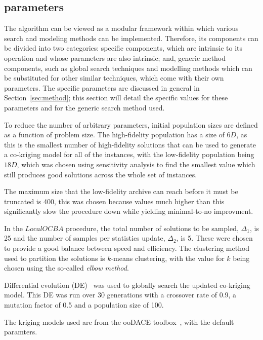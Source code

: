 \subsection{\AlgName{} parameters}
The \AlgName{} algorithm can be viewed as a modular framework within which various search and modeling methods can be implemented. Therefore, its components can be divided into two categories: \AlgName{} specific components, which are intrinsic to its operation and whose parameters are also intrinsic; and, generic method components, such as global search techniques and modelling methods which can be substituted for other similar techniques, which come with their own parameters. The \AlgName{} specific parameters are discussed in general in Section~\ref{sec:method}; this section will detail the specific values for these  parameters and for the generic search method used.

To reduce the number of arbitrary parameters, initial population sizes are defined as a function of problem size. The high-fidelity population has a size of $6D$, as this is the smallest number of high-fidelity solutions that can be used to generate a co-kriging model for all of the instances, with the low-fidelity population being $18D$, which was chosen using sensitivity analysis to find the smallest value which still produces good solutions across the whole set of instances.

The maximum size that the low-fidelity archive can reach before it must be truncated is 400, this was chosen because values much higher than this significantly slow the procedure down while yielding minimal-to-no improvment. 

In the $LocalOCBA$ procedure, the total number of solutions to be sampled, $\Delta_1$, is 25 and the number of samples per statistics update, $\Delta_2$, is 5. These were chosen to provide a good balance between speed and efficiency. The clustering method used to partition the solutions is $k$-means clustering, with the value for $k$ being chosen using the so-called \emph{elbow method}.

Differential evolution (DE)~\cite{storn1997differential} was used to globally search the updated co-kriging model. This DE was run over 30 generations with a crossover rate of 0.9, a mutation factor of 0.5 and a population size of 100. 

The kriging models used are from the ooDACE toolbox~\cite{oodace}, with the default paramters.

